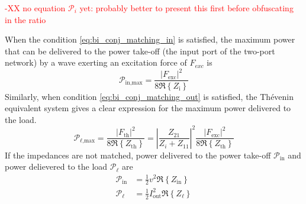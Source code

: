 \documentclass[lettersize,journal]{IEEEtran}
\newcommand{\rc}[1]{\textcolor{red}{#1}}
\begin{document}
\rc{-XX no equation $\mathcal{P}_i$ yet: probably better to present this first before obfuscating in the ratio}

When the condition \eqref{eq:bi_conj_matching_in} is satisfied, the maximum power that can be delivered to the power take-off (the input port of the two-port network) by a wave exerting an excitation force of $F_{exc}$ \cite{Falnes:2002aa} is
\begin{equation}
        \mathcal{P}_{\textrm{in,max}} = \frac{| F_{\textrm{exc}} |^2 }{ 8 \Re \left\{ Z_{\textrm{i}} \right\} }
\end{equation}
Similarly, when condition \eqref{eq:bi_conj_matching_out} is satisfied, the Th\'{e}venin equivalent system gives a clear expression for the maximum power delivered to the load.
\begin{equation}
        \mathcal{P}_{\ell\textrm{,max}} = \frac{| F_{\textrm{th}} |^2 }{ 8 \Re \left\{ Z_{\textrm{th}} \right\} }
        = \left| \frac{ Z_{21} }{ Z_i + Z_{11} } \right| ^2 \frac{ | F_{\textrm{exc}} |^2 }{ 8 \Re \left\{ Z_{\textrm{th}} \right\} } \label{eq:max_power_delivered_thevenin}
\end{equation}
If the impedances are not matched, power delivered to the power take-off $\mathcal{P}_{\textrm{in}}$ and power delievered to the load $\mathcal{P}_\ell$ are
\begin{subequations}
        \begin{align}
                \mathcal{P}_{\textrm{in}} &= \frac{1}{2} v^2 \Re \left\{ Z_{\textrm{in}} \right\}\\
                \mathcal{P}_\ell &= \frac{1}{2} I_{\textrm{out}}^2 \Re \left\{ Z_{\ell} \right\}
        \end{align}
\end{subequations}
\end{document}
